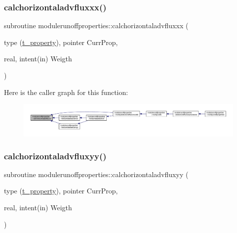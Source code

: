 \subsubsection{\texorpdfstring{calchorizontaladvfluxxx()}{calchorizontaladvfluxxx()}}
{\footnotesize\ttfamily subroutine modulerunoffproperties\+::calchorizontaladvfluxxx (\begin{DoxyParamCaption}\item[{type (\mbox{\hyperlink{structmodulerunoffproperties_1_1t__property}{t\+\_\+property}}), pointer}]{Curr\+Prop,  }\item[{real, intent(in)}]{Weigth }\end{DoxyParamCaption})\hspace{0.3cm}{\ttfamily [private]}}

Here is the caller graph for this function\+:\nopagebreak
\begin{figure}[H]
\begin{center}
\leavevmode
\includegraphics[width=350pt]{namespacemodulerunoffproperties_a23224aa9dab3db29383ab466a5695a17_icgraph}
\end{center}
\end{figure}
\mbox{\label{namespacemodulerunoffproperties_a9d3bb361bae08dcb2b84d831a49712be}} 
\subsubsection{\texorpdfstring{calchorizontaladvfluxyy()}{calchorizontaladvfluxyy()}}
{\footnotesize\ttfamily subroutine modulerunoffproperties\+::calchorizontaladvfluxyy (\begin{DoxyParamCaption}\item[{type (\mbox{\hyperlink{structmodulerunoffproperties_1_1t__property}{t\+\_\+property}}), pointer}]{Curr\+Prop,  }\item[{real, intent(in)}]{Weigth }\end{DoxyParamCaption})\hspace{0.3cm}{\ttfamily [private]}}

